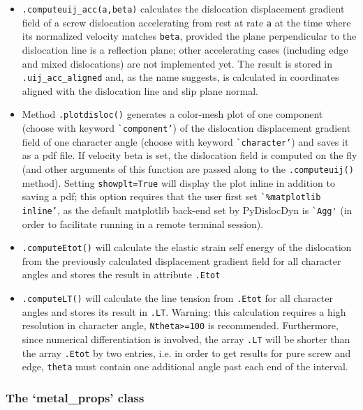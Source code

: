 \documentclass[11pt,letterpaper,oneside,pdftex]{article}
\begin{document}
\begin{itemize}
\item \verb|.computeuij_acc(a,beta)| calculates the dislocation displacement gradient field of a screw dislocation accelerating from rest at rate \verb|a| at the time where its normalized velocity matches \verb|beta|, provided the plane perpendicular to the dislocation line is a reflection plane;
other accelerating cases (including edge and mixed dislocations) are not implemented yet.
The result is stored in \verb|.uij_acc_aligned| and, as the name suggests, is calculated in coordinates aligned with the dislocation line and slip plane normal.

\item Method \verb|.plotdisloc()| generates a color-mesh plot of one component (choose with keyword \verb|`component’|) of the dislocation displacement gradient field of one character angle (choose with keyword \verb|`character’|) and saves it as a pdf file.
If velocity beta is set, the dislocation field is computed on the fly (and other arguments of this function are passed along to the \verb|.computeuij()| method).
Setting \verb|showplt=True| will display the plot inline in addition to saving a pdf;
this option requires that the user first set \verb|`%matplotlib inline’|, as the default matplotlib back-end set by PyDislocDyn is \verb|`Agg'| (in order to facilitate running in a remote terminal session).

\item \verb|.computeEtot()| will calculate the elastic strain self energy of the dislocation from the previously calculated displacement gradient field for all character angles and stores the result in attribute \verb|.Etot|

\item \verb|.computeLT()| will calculate the line tension from \verb|.Etot| for all character angles and stores its result in \verb|.LT|.
Warning: this calculation requires a high resolution in character angle, \verb|Ntheta>=100| is recommended.
Furthermore, since numerical differentiation is involved, the array \verb|.LT| will be shorter than the array \verb|.Etot| by two entries, i.e. in order to get results for pure screw and edge, \verb|theta| must contain one additional angle past each end of the interval.
\end{itemize}


\subsubsection{The `metal\_props' class}
\label{sec:metal_props}
\end{document}
